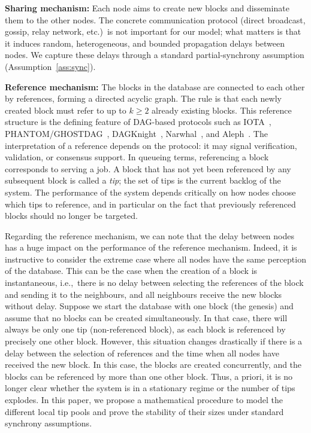 \documentclass[a4paper,12pt,oneside,reqno]{amsart}
\newcommand{\1}{{\mathbf 1}}
\begin{document}
\textbf{Sharing mechanism:} Each node aims to create new blocks and disseminate them to the other nodes. The concrete communication protocol (direct broadcast, gossip, relay network, etc.)\ is not important for our model; what matters is that it induces random, heterogeneous, and bounded propagation delays between nodes. We capture these delays through a standard partial-synchrony assumption (Assumption~\ref{ass:sync}).

\textbf{Reference mechanism:} The blocks in the database are connected to each other by references, forming a directed acyclic graph. The rule is that each newly created block must refer to up to $k\geq 2$ already existing blocks. This reference structure is the defining feature of DAG-based protocols such as IOTA~\cite{popov2015,OTV}, PHANTOM/GHOSTDAG~\cite{phantom}, DAGKnight~\cite{SuttonSompolinsky2022DAGKnight}, Narwhal~\cite{Narwhal22}, and Aleph~\cite{gkagol2019aleph}. The interpretation of a reference depends on the protocol: it may signal verification, validation, or consensus support. In queueing terms, referencing a block corresponds to serving a job. A block that has not yet been referenced by any subsequent block is called a \emph{tip}; the set of tips is the current backlog of the system. The performance of the system depends critically on how nodes choose which tips to reference, and in particular on the fact that previously referenced blocks should no longer be targeted.

Regarding the reference mechanism, we can note that the delay between nodes has a huge impact on the performance of the reference mechanism. Indeed, it is instructive to consider the extreme case where all nodes have the same perception of the database. This can be the case when the creation of a block is instantaneous, i.e.,~there is no delay between selecting the references of the block and sending it to the neighbours, and all neighbours receive the new blocks without delay. Suppose we start the database with one block (the genesis) and assume that no blocks can be created simultaneously. In that case, there will always be only one tip (non-referenced block), as each block is referenced by precisely one other block. However, this situation changes drastically if there is a delay between the selection of references and the time when all nodes have received the new block. In this case, the blocks are created concurrently, and the blocks can be referenced by more than one other block. Thus, a priori, it is no longer clear whether the system is in a stationary regime or the number of tips explodes. 
In this paper, we propose a mathematical procedure to model the different local tip pools and prove the stability of their sizes under standard synchrony assumptions.
\end{document}
